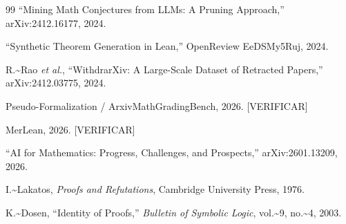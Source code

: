 \documentclass[12pt,a4paper]{article}
\theoremstyle{remark}
\begin{document}
\begin{thebibliography}{99}
``Mining Math Conjectures from LLMs: A Pruning Approach,''
arXiv:2412.16177, 2024.

``Synthetic Theorem Generation in Lean,''
OpenReview EeDSMy5Ruj, 2024.

R.\textasciitilde{}Rao \emph{et al.}, ``WithdrarXiv: A Large-Scale Dataset of Retracted Papers,''
arXiv:2412.03775, 2024.

Pseudo-Formalization / ArxivMathGradingBench, 2026. {[}VERIFICAR{]}

MerLean, 2026. {[}VERIFICAR{]}

``AI for Mathematics: Progress, Challenges, and Prospects,''
arXiv:2601.13209, 2026.

I.\textasciitilde{}Lakatos, \emph{Proofs and Refutations}, Cambridge University Press, 1976.

K.\textasciitilde{}Dosen, ``Identity of Proofs,''
\emph{Bulletin of Symbolic Logic}, vol.\textasciitilde{}9, no.\textasciitilde{}4, 2003.

\end{thebibliography}
\end{document}
